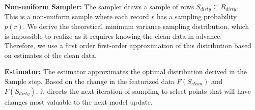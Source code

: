 \vspace{0.5em}

\noindent\textbf{Non-uniform Sampler: } The sampler draws a sample of rows $S_{dirty} \subseteq R_{dirty}$. This is a non-uniform sample where each record $r$ has a sampling probability $p(r)$.
We derive the theoretical minimum variance sampling distribution, which is impossible to realize as it requires knowing the clean data in advance. Therefore, we use a first order first-order approximation of this distribution based on estimates of the clean data. 

\vspace{0.5em}

\noindent\textbf{Estimator: } The estimator approximates the optimal distribution derived in the Sample step. Based on the change in the featurized data $F(S_{clean})$ and $F(S_{dirty})$, it directs the next iteration of sampling to select points that will have changes most valuable to the next model update.




